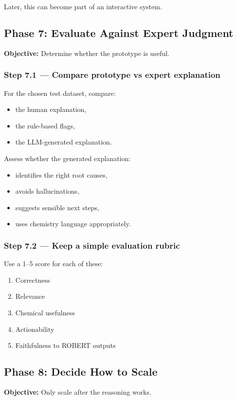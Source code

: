 \documentclass[11pt]{article}
\begin{document}
Later, this can become part of an interactive system.

\subsection{Phase 7: Evaluate Against Expert Judgment}
\textbf{Objective:} Determine whether the prototype is useful.

\subsubsection*{Step 7.1 --- Compare prototype vs expert explanation}
For the chosen test dataset, compare:

\begin{itemize}
    \item the human explanation,
    \item the rule-based flags,
    \item the LLM-generated explanation.
\end{itemize}

Assess whether the generated explanation:

\begin{itemize}
    \item identifies the right root causes,
    \item avoids hallucinations,
    \item suggests sensible next steps,
    \item uses chemistry language appropriately.
\end{itemize}

\subsubsection*{Step 7.2 --- Keep a simple evaluation rubric}
Use a 1--5 score for each of these:

\begin{enumerate}
    \item Correctness
    \item Relevance
    \item Chemical usefulness
    \item Actionability
    \item Faithfulness to ROBERT outputs
\end{enumerate}

\subsection{Phase 8: Decide How to Scale}
\textbf{Objective:} Only scale after the reasoning works.
\end{document}
